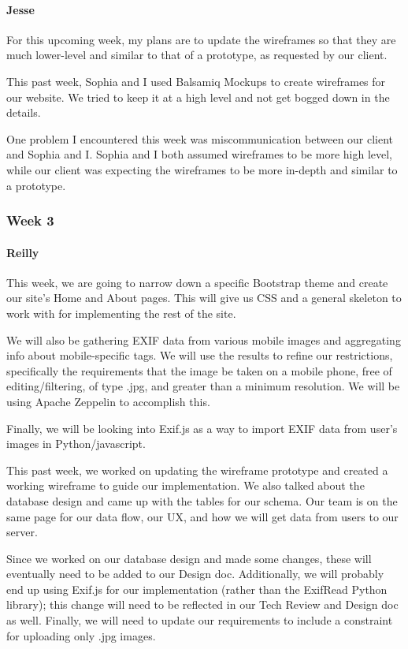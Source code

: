 \documentclass[onecolumn, draftclsnofoot,10pt, compsoc]{IEEEtran}
\begin{document}
\begin{flushleft}
\paragraph{Jesse}
 
For this upcoming week, my plans are to update the wireframes so that they are much lower-level and similar to that of a prototype, as requested by our client.
 
 
This past week, Sophia and I used Balsamiq Mockups to create wireframes for our website. We tried to keep it at a high level and not get bogged down in the details.
 
 
One problem I encountered this week was miscommunication between our client and Sophia and I. Sophia and I both assumed wireframes to be more high level, while our client was expecting the wireframes to be more in-depth and similar to a prototype.
 
\subsubsection{Week 3}
\paragraph{Reilly}
 
This week, we are going to narrow down a specific Bootstrap theme and create our site's Home and About pages. This will give us CSS and a general skeleton to work with for implementing the rest of the site.
 
We will also be gathering EXIF data from various mobile images and aggregating info about mobile-specific tags. We will use the results to refine our restrictions, specifically the requirements that the image be taken on a mobile phone, free of editing/filtering, of type .jpg, and greater than a minimum resolution. We will be using Apache Zeppelin to accomplish this.
 
Finally, we will be looking into Exif.js as a way to import EXIF data from user's images in Python/javascript.
 
 
This past week, we worked on updating the wireframe prototype and created a working wireframe to guide our implementation. We also talked about the database design and came up with the tables for our schema. Our team is on the same page for our data flow, our UX, and how we will get data from users to our server.
 
 
Since we worked on our database design and made some changes, these will eventually need to be added to our Design doc. Additionally, we will probably end up using Exif.js for our implementation (rather than the ExifRead Python library); this change will need to be reflected in our Tech Review and Design doc as well. Finally, we will need to update our requirements to include a constraint for uploading only .jpg images.
 

\end{flushleft}
\end{document}
